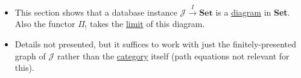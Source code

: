 \begin{itemize}
    \item This section shows that a database instance $\mathcal{J}\xrightarrow{I}\mathbf{Set}$ is a \hyperref[D3.51]{diagram} in \textbf{Set}. Also the functor $\Pi_!$ takes the \hyperref[D3.92b]{limit} of this diagram.
    \item Details not presented, but it suffices to work with just the finitely-presented graph of $\mathcal{J}$ rather than the \hyperref[D3.6]{category} itself (path equations not relevant for this).
  \end{itemize}
